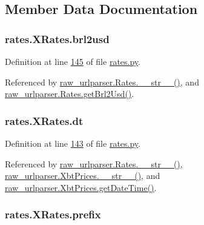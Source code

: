 \subsection{Member Data Documentation}
\subsubsection[{\texorpdfstring{brl2usd}{brl2usd}}]{\setlength{\rightskip}{0pt plus 5cm}rates.\+X\+Rates.\+brl2usd}\hypertarget{classrates_1_1_x_rates_acb0a8b6ec059b823c8a46eb115341251}{}\label{classrates_1_1_x_rates_acb0a8b6ec059b823c8a46eb115341251}


Definition at line \hyperlink{rates_8py_source_l00145}{145} of file \hyperlink{rates_8py_source}{rates.\+py}.



Referenced by \hyperlink{raw__urlparser_8py_source_l00038}{raw\+\_\+urlparser.\+Rates.\+\_\+\+\_\+str\+\_\+\+\_\+()}, and \hyperlink{raw__urlparser_8py_source_l00029}{raw\+\_\+urlparser.\+Rates.\+get\+Brl2\+Usd()}.

\subsubsection[{\texorpdfstring{dt}{dt}}]{\setlength{\rightskip}{0pt plus 5cm}rates.\+X\+Rates.\+dt}\hypertarget{classrates_1_1_x_rates_aa7835a0ac1d41af607d6d5885b49c131}{}\label{classrates_1_1_x_rates_aa7835a0ac1d41af607d6d5885b49c131}


Definition at line \hyperlink{rates_8py_source_l00143}{143} of file \hyperlink{rates_8py_source}{rates.\+py}.



Referenced by \hyperlink{raw__urlparser_8py_source_l00038}{raw\+\_\+urlparser.\+Rates.\+\_\+\+\_\+str\+\_\+\+\_\+()}, \hyperlink{raw__urlparser_8py_source_l00074}{raw\+\_\+urlparser.\+Xbt\+Prices.\+\_\+\+\_\+str\+\_\+\+\_\+()}, and \hyperlink{raw__urlparser_8py_source_l00059}{raw\+\_\+urlparser.\+Xbt\+Prices.\+get\+Date\+Time()}.

\subsubsection[{\texorpdfstring{prefix}{prefix}}]{\setlength{\rightskip}{0pt plus 5cm}rates.\+X\+Rates.\+prefix}\hypertarget{classrates_1_1_x_rates_a3b92b41b0fbd77b44d01f094ff83dd9d}{}\label{classrates_1_1_x_rates_a3b92b41b0fbd77b44d01f094ff83dd9d}


